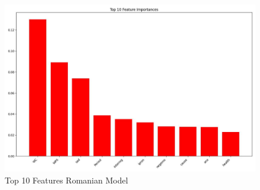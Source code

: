 \begin{figure}[htbp]
	\centering
		\includegraphics[scale=0.5]{LaTeX Bachelor Thesis Depression Signs Detection/figures/metrics/experimentRomanian/top10features.jpg}
	\caption{Top 10 Features Romanian Model}
	\label{top10FeaturesRomanianExperiment}
\end{figure}



